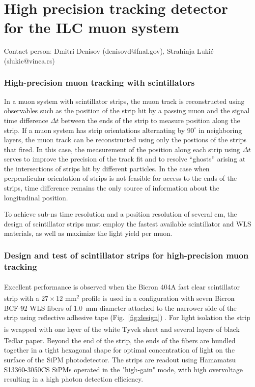 \section{High precision tracking detector for the ILC muon system}

Contact person: Dmitri Denisov (denisovd@fnal.gov), Strahinja Lukić (slukic@vinca.rs)

\subsubsection{High-precision muon tracking with scintillators}

In a muon system with scintillator strips, the muon track is reconstructed using observables such as the position of the strip hit by a passing muon and the signal time difference $\Delta t$ between the ends of the strip to measure position along the strip. If a muon system has strip orientations alternating by $90^{\circ}$ in neighboring layers, the muon track can be reconstructed using only the postions of the strips that fired. In this case, the measurement of the position along each strip using $\Delta t$ serves to improve the precision of the track fit and to resolve “ghosts” arising at the intersections of strips hit by different particles. In the case when perpendicular orientation of strips is not feasible for access to the ends of the strips, time difference remains the only source of information about the longitudinal position.

To achieve sub-ns time resolution and a position resolution of several cm, the design of scintillator strips must employ the fastest available scintillator and WLS materials, as well as maximize the light yield per muon.

\subsubsection{Design and test of scintillator strips for high-precision muon tracking}

Excellent performance is observed when the Bicron\textsuperscript{\textcopyright} 404A fast clear scintillator strip with a $27 \times 12 \text{ mm}^2$ profile is used in a configuration with seven Bicron\textsuperscript{\textcopyright} BCF-92 WLS fibers of 1.0~mm diameter attached to the narrower side of the strip using reflective adhesive tape (Fig.\ \ref{fig:design}) \cite{Denisov16}. For light isolation the strip is wrapped with one layer of the white Tyvek\textsuperscript{\textregistered} sheet and several layers of black Tedlar\textsuperscript{\textregistered} paper. Beyond the end of the strip, the ends of the fibers are bundled together in a tight hexagonal shape for optimal concentration of light on the surface of the SiPM photodetector. The strips are readout using Hamamatsu S13360-3050CS SiPMs operated in the "high-gain" mode, with high overvoltage resulting in a high photon detection efficiency.


